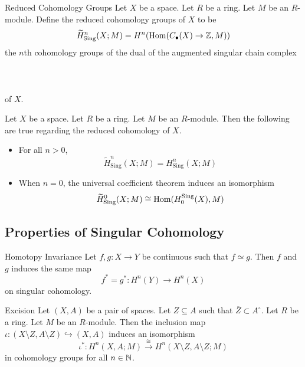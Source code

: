 \documentclass[a4paper]{article}
\begin{document}
\begin{defn}{Reduced Cohomology Groups}{} Let $X$ be a space. Let $R$ be a ring. Let $M$ be an $R$-module. Define the reduced cohomology groups of $X$ to be $$\widetilde{H}_\text{Sing}^n(X;M)=H^n(\operatorname{Hom}(C_\bullet(X)\to\mathbb{Z},M))$$ the $n$th cohomology groups of the dual of the augmented singular chain complex \\~\\
\\~\\
of $X$. 
\end{defn}

\begin{prp}{}{} Let $X$ be a space. Let $R$ be a ring. Let $M$ be an $R$-module. Then the following are true regarding the reduced cohomology of $X$. 
\begin{itemize}
\item For all $n>0$, $$\widetilde{H}_\text{Sing}^n(X;M)=H_\text{Sing}^n(X;M)$$
\item When $n=0$, the universal coefficient theorem induces an isomorphism $$\widetilde{H}_\text{Sing}^0(X;M)\cong\operatorname{Hom}(H_0^\text{Sing}(X),M)$$
\end{itemize}
\end{prp}

\subsection{Properties of Singular Cohomology}
\begin{thm}{Homotopy Invariance}{} Let $f,g:X\to Y$ be continuous such that $f\simeq g$. Then $f$ and $g$ induces the same map $$f^\ast=g^\ast:H^n(Y)\to H^n(X)$$ on singular cohomology. 
\end{thm}

\begin{thm}{Excision}{} Let $(X,A)$ be a pair of spaces. Let $Z\subseteq A$ such that $\overline{Z}\subset A^\circ$. Let $R$ be a ring. Let $M$ be an $R$-module. Then the inclusion map $\iota:(X\setminus Z,A\setminus Z)\hookrightarrow(X,A)$ induces an isomorphism $$\iota^\ast:H^n(X,A;M)\overset{\cong}{\longrightarrow}H^n(X\setminus Z,A\setminus Z;M)$$ in cohomology groups for all $n\in\mathbb{N}$. 
\end{thm}
\end{document}
